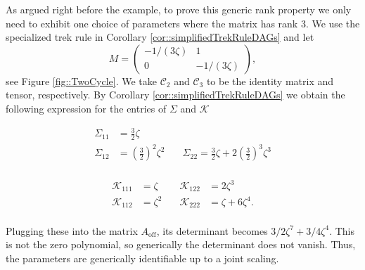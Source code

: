 \documentclass{biometrika}
\begin{document}
\begin{example}
As argued right before the example, to prove this generic rank property we only need to exhibit one choice of parameters where the matrix has rank 3. We use the specialized trek rule in Corollary \ref{cor::simplifiedTrekRuleDAGs} and let
\begin{equation*}
    M = \begin{pmatrix}
    -1/(3 \zeta) & 1 \\ 
    0 & -1/(3 \zeta)
\end{pmatrix},
\end{equation*}
 see Figure \ref{fig::TwoCycle}. We take $\mathcal{C}_2$ and $\mathcal{C}_3$ to be the identity matrix and tensor, respectively. By Corollary \ref{cor::simplifiedTrekRuleDAGs}  we obtain the following expression for the entries of $\Sigma$ and $\mathcal{K} $

 \begin{minipage}{0.45\textwidth}
 \begin{align*}
    \Sigma_{11} & = \frac{3}{2} \zeta  & \\
    \Sigma_{12} & = \left(\frac{3}{2} \right)^2 \zeta^2 \quad  & 
    \Sigma_{22} = \frac{3}{2} \zeta + 2 \left(\frac{3}{2} \right)^3 \zeta^3 \\
 \end{align*} 
 \end{minipage}
 \hfill
 \begin{minipage}{0.45\textwidth}
 \begin{align*}
 \mathcal{K} _{111} & = \zeta & \quad \mathcal{K} _{122} & = 2 \zeta^3 \\[2mm]
 \mathcal{K} _{112} & = \zeta^2 & \quad \mathcal{K} _{222} & = \zeta + 6 \zeta^4. \\
 \end{align*}
 \end{minipage}


Plugging these into the matrix $A_{\mathrm{off}}$, its determinant becomes
$3/2 \zeta^7 + 3/4 \zeta ^4$. This is not the zero polynomial, so generically the determinant does not vanish. Thus, the parameters are generically identifiable up to a joint scaling. 


\end{example}
\end{document}
